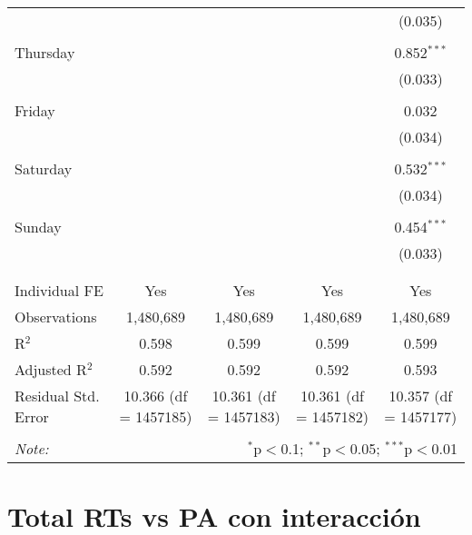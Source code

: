 \documentclass[
]{article}
\begin{document}
\begin{table}[!htbp]
{\begin{tabular}{@{\extracolsep{5pt}}lcccc}
  &  &  &  & (0.035) \\ 
  & & & & \\ 
 Thursday &  &  &  & 0.852$^{***}$ \\ 
  &  &  &  & (0.033) \\ 
  & & & & \\ 
 Friday &  &  &  & 0.032 \\ 
  &  &  &  & (0.034) \\ 
  & & & & \\ 
 Saturday &  &  &  & 0.532$^{***}$ \\ 
  &  &  &  & (0.034) \\ 
  & & & & \\ 
 Sunday &  &  &  & 0.454$^{***}$ \\ 
  &  &  &  & (0.033) \\ 
  & & & & \\ 
\hline \\[-1.8ex] 
Individual FE & Yes & Yes & Yes & Yes \\ 
Observations & 1,480,689 & 1,480,689 & 1,480,689 & 1,480,689 \\ 
R$^{2}$ & 0.598 & 0.599 & 0.599 & 0.599 \\ 
Adjusted R$^{2}$ & 0.592 & 0.592 & 0.592 & 0.593 \\ 
Residual Std. Error & 10.366 (df = 1457185) & 10.361 (df = 1457183) & 10.361 (df = 1457182) & 10.357 (df = 1457177) \\ 
\hline 
\hline \\[-1.8ex] 
\textit{Note:}  & \multicolumn{4}{r}{$^{*}$p$<$0.1; $^{**}$p$<$0.05; $^{***}$p$<$0.01} \\ 
\end{tabular}
} 
\end{table} 
\newpage
\section{Total RTs vs PA con interacción}
\end{document}
